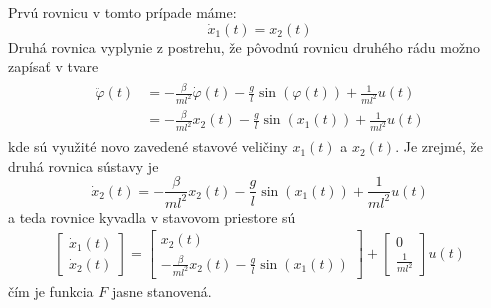 \documentclass[a4paper, 10pt, ]{article}
\begin{document}
Prvú rovnicu v tomto prípade máme:
\begin{equation}
    \dot x_1(t) = x_2(t)
\end{equation}
Druhá rovnica vyplynie z postrehu, že pôvodnú rovnicu druhého rádu možno zapísať v tvare
\begin{align}
    \begin{split}
    \ddot \varphi(t) &= -\frac{\beta}{ml^2}\dot\varphi(t) - \frac{g}{l} \sin\left( \varphi(t) \right) + \frac{1}{ml^2} u(t) \\
                     &= -\frac{\beta}{ml^2} x_2(t) - \frac{g}{l} \sin\left( x_1(t) \right) + \frac{1}{ml^2} u(t)
    \end{split}
\end{align}
kde sú využité novo zavedené stavové veličiny $x_1(t)$ a $x_2(t)$. Je zrejmé, že druhá rovnica sústavy je
\begin{equation}
    \dot x_2(t) = -\frac{\beta}{ml^2} x_2(t) - \frac{g}{l} \sin\left( x_1(t) \right) + \frac{1}{ml^2} u(t)
\end{equation}
a teda rovnice kyvadla v stavovom priestore sú
\begin{align} \label{rovniceKyvSSpredpis}
    \begin{bmatrix} \dot x_1(t) \\ \dot x_2(t)  \end{bmatrix} = \begin{bmatrix} x_2(t) \\ -\frac{\beta}{ml^2} x_2(t) - \frac{g}{l} \sin\left( x_1(t) \right)  \end{bmatrix} + \begin{bmatrix} 0 \\ \frac{1}{ml^2} \end{bmatrix} u(t)
\end{align}
čím je funkcia $F$ jasne stanovená.
\end{document}

